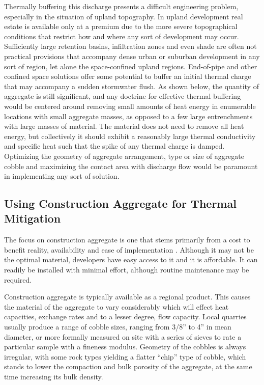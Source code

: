 Thermally buffering this discharge presents a difficult engineering problem, especially in the situation of upland topography. In upland development real estate is available only at a premium due to the more severe topographical conditions that restrict how and where any sort of development may occur. Sufficiently large retention basins, infiltration zones and even shade are often not practical provisions that accompany dense urban or suburban development in any sort of region, let alone the space-confined upland regions. End-of-pipe and other confined space solutions offer some potential to buffer an initial thermal charge that may accompany a sudden stormwater flush. As shown below, the quantity of aggregate is still significant, and any doctrine for effective thermal buffering would be centered around removing small amounts of heat energy in enumerable locations with small aggregate masses, as opposed to a few large entrenchments with large masses of material. The material does not need to remove all heat energy, but collectively it should exhibit a reasonably large thermal conductivity and specific heat such that the spike of any thermal charge is damped. Optimizing the geometry of aggregate arrangement, type or size of aggregate cobble and maximizing the contact area with discharge flow would be paramount in implementing any sort of solution. 

\subsection{Using Construction Aggregate for Thermal Mitigation}
The focus on construction aggregate is one that stems primarily from a cost to benefit reality, availability and ease of implementation \citep{ballast}. Although it may not be the optimal material, developers have easy access to it and it is affordable. It can readily be installed with minimal effort, although routine maintenance may be required.
 
Construction aggregate is typically available as a regional product. This causes the material of the aggregate to vary considerably which will effect heat capacities, exchange rates and to a lesser degree, flow capacity. Local quarries usually produce a range of cobble sizes, ranging from 3/8'' to 4'' in mean diameter, or more formally measured on site with a series of sieves to rate a particular sample with a fineness modulus. Geometry of the cobbles is always irregular, with some rock types yielding a flatter “chip” type of cobble, which stands to lower the compaction and bulk porosity of the aggregate, at the same time increasing its bulk density. 


